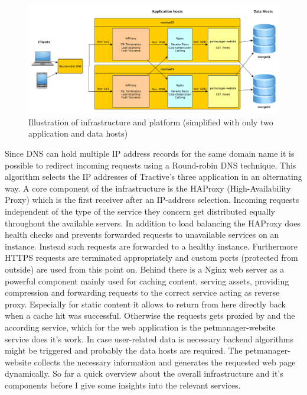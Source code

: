 \begin{figure}[h]
	\centering
		\includegraphics[width=1.0\textwidth]{imgs/architecture.png}
	\caption{Illustration of infrastructure and platform (simplified with only two application and data hosts)}
\end{figure}

Since DNS can hold multiple IP address records for the same domain name it is possible to redirect incoming requests using a Round-robin DNS technique. This algorithm selects the IP addresses of Tractive's three application in an alternating way. A core component of the infrastructure is the HAProxy (High-Availability Proxy) which is the first receiver after an IP-address selection. Incoming requests independent of the type of the service they concern get distributed equally throughout the available servers. In addition to load balancing the HAProxy does health checks and prevents forwarded requests to unavailable services on an instance. Instead such requests are forwarded to a healthy instance. Furthermore HTTPS requests are terminated appropriately and custom ports (protected from outside) are used from this point on. Behind there is a Nginx web server as a powerful component mainly used for caching content, serving assets, providing compression and forwarding requests to the correct service acting as reverse proxy. Especially for static content it allows to return from here directly back when a cache hit was successful. Otherwise the requests gets proxied by and the according service, which for the web application is the petmanager-website service does it's work. In case user-related data is necessary backend algorithms might be triggered and probably the data hosts are required. The petmanager-website collects the necessary information and generates the requested web page dynamically. 
So far a quick overview about the overall infrastructure and it's components before I give some insights into the relevant services. 

